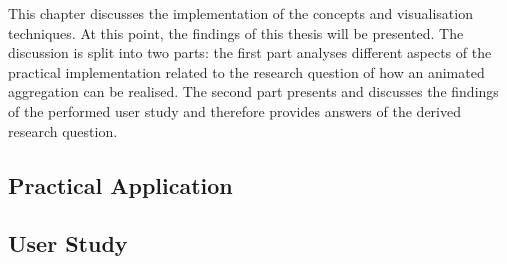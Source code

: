 This chapter discusses the implementation of the concepts and visualisation techniques. At this point, the findings of this thesis will be presented. The discussion is split into two parts: the first part analyses different aspects of the practical implementation related to the research question of how an animated aggregation can be realised. The second part presents and discusses the findings of the performed user study and therefore provides answers of the derived research question.

\subsection{Practical Application}


\subsection{User Study}
\label{s:discussion-study}

